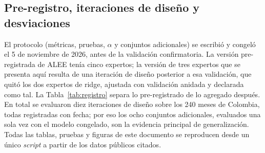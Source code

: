 \documentclass[11pt]{article}
\begin{document}
\subsection{Pre-registro, iteraciones de diseño y desviaciones}
\label{sec:preregistro}

El protocolo (métricas, pruebas, $\alpha$ y conjuntos adicionales) se escribió y congeló el 5 de noviembre de 2026, antes de la validación confirmatoria. La versión pre-registrada de ALEE tenía cinco expertos; la versión de tres expertos que se presenta aquí resulta de una iteración de diseño posterior a esa validación, que quitó los dos expertos de ridge, ajustada con validación anidada y declarada como tal. La Tabla~\ref{tab:registro} separa lo pre-registrado de lo agregado después. En total se evaluaron diez iteraciones de diseño sobre los 240 meses de Colombia, todas registradas con fecha; por eso los ocho conjuntos adicionales, evaluados una sola vez con el modelo congelado, son la evidencia principal de generalización. Todas las tablas, pruebas y figuras de este documento se reproducen desde un único \textit{script} a partir de los datos públicos citados.
\end{document}
